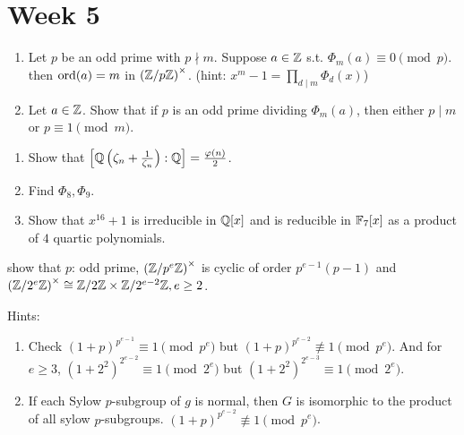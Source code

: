 
\section{Week 5}

\begin{exercise} \mbox{}
  \begin{enumerate}
    \item Let $p$ be an odd prime with $p \nmid m$.
      Suppose $a \in \mathbb{Z}$ s.t. $\Phi_m(a) \equiv 0 \pmod p$. then
      $\operatorname{ord}(a) = m$ in $\left({\mathbb{Z}}/{p\mathbb{Z}}\right)^\times$.
      (hint: $x^m - 1 = \prod_{d\mid m} \Phi_d(x)$)
    \item Let $a\in \mathbb{Z}$. Show that if $p$ is an odd prime dividing $\Phi_m(a)$,
      then either $p \mid m$ or $p \equiv 1 \pmod m$.
  \end{enumerate}
\end{exercise}

\begin{exercise} \mbox{}
  \begin{enumerate}
    \item Show that $\left[\mathbb{Q}\left(\zeta_n + \frac{1}{\zeta_n}\right) : \mathbb{Q}\right]
      = \frac{\varphi(n)}{2}$.
    \item Find $\Phi_8, \Phi_9$.
    \item Show that $x^{16} + 1$ is irreducible in $\mathbb{Q}[x]$ and is reducible
      in $\mathbb{F}_7[x]$ as a product of $4$ quartic polynomials.
  \end{enumerate}
\end{exercise}

\begin{exercise}
  show that $p$: odd prime, $\left({\mathbb{Z}}/{p^e\mathbb{Z}}\right)^\times$ is cyclic
  of order $p^{e-1}(p-1)$ and $\left({\mathbb{Z}}/{2^e\mathbb{Z}}\right)^\times \cong
  {\mathbb{Z}}/{2\mathbb{Z}} \times {\mathbb{Z}}/{2^{e-2}\mathbb{Z}}, e\ge 2$.
  
  Hints:
  \begin{enumerate}
    \item Check $(1+p)^{p^{e-1}} \equiv 1 \pmod{p^e}$ but
      $(1+p)^{p^{e-2}} \not\equiv 1 \pmod{p^e}$. And for $e \ge 3$,
      $(1+2^2)^{2^{e-2}} \equiv 1 \pmod{2^e}$ but
      $(1+2^2)^{2^{e-3}} \equiv 1 \pmod{2^e}$.
    \item If each Sylow $p$-subgroup of $g$ is normal, then $G$ is isomorphic
      to the product of all sylow $p$-subgroups.
      $(1+p)^{p^{e-2}} \not\equiv 1 \pmod{p^e}$.
  \end{enumerate}
\end{exercise}

